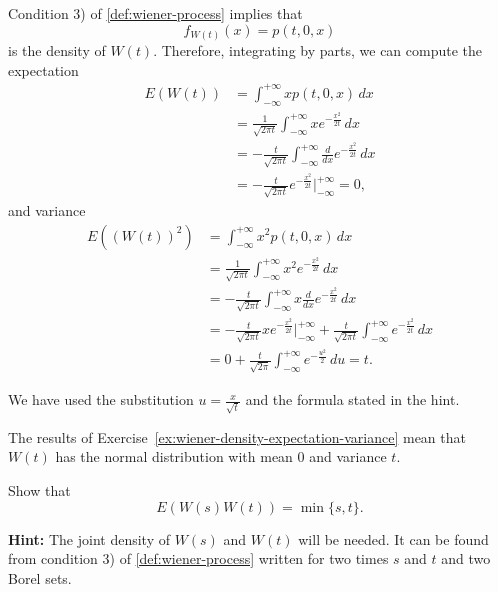 \begin{Solution}
Condition 3) of \cref{def:wiener-process} implies that
\[
f_{W(t)}(x) = p(t, 0, x)
\]
is the density of $W(t)$. Therefore, integrating by parts, we can compute the expectation
\begin{equation}
\begin{aligned}
E(W(t)) &= \int_{-\infty}^{+\infty} x p(t, 0, x) \, dx \\
&= \frac{1}{\sqrt{2\pi t}} \int_{-\infty}^{+\infty} x e^{-\frac{x^2}{2t}} \, dx \\
&= -\frac{t}{\sqrt{2\pi t}} \int_{-\infty}^{+\infty} \frac{d}{dx} e^{-\frac{x^2}{2t}} \, dx \\
&= -\frac{t}{\sqrt{2\pi t}} e^{-\frac{x^2}{2t}}\Big|_{-\infty}^{+\infty} = 0,
\end{aligned}
\end{equation}
and variance
\begin{equation}
\begin{aligned}
E\left((W(t))^2\right) &= \int_{-\infty}^{+\infty} x^2 p(t, 0, x) \, dx \\
&= \frac{1}{\sqrt{2\pi t}} \int_{-\infty}^{+\infty} x^2 e^{-\frac{x^2}{2t}} \, dx \\
&= -\frac{t}{\sqrt{2\pi t}} \int_{-\infty}^{+\infty} x \frac{d}{dx} e^{-\frac{x^2}{2t}} \, dx \\
&= -\frac{t}{\sqrt{2\pi t}} x e^{-\frac{x^2}{2t}}\Big|_{-\infty}^{+\infty} + \frac{t}{\sqrt{2\pi t}} \int_{-\infty}^{+\infty} e^{-\frac{x^2}{2t}} \, dx \\
&= 0 + \frac{t}{\sqrt{2\pi}} \int_{-\infty}^{+\infty} e^{-\frac{u^2}{2}} \, du = t.
\end{aligned}
\end{equation}

We have used the substitution $u = \frac{x}{\sqrt{t}}$ and the formula stated in the hint.
\end{Solution}

\begin{Remark}
\label{rem:wiener-normal}
The results of Exercise~\ref{ex:wiener-density-expectation-variance} mean that $W(t)$ has the normal distribution with mean 0 and variance $t$.
\end{Remark}

\begin{Exercise}
\label{ex:wiener-correlation}
Show that
\[
E(W(s) W(t)) = \min\{s, t\}.
\]

\noindent\textbf{Hint:} The joint density of $W(s)$ and $W(t)$ will be needed. It can be found from condition 3) of \cref{def:wiener-process} written for two times $s$ and $t$ and two Borel sets.
\end{Exercise}

